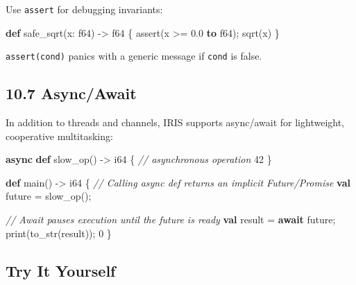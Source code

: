 \documentclass[
  english,
]{book}
\newenvironment{Shaded}{\begin{snugshade}}{\end{snugshade}}
\newcommand{\CommentTok}[1]{\textcolor[rgb]{0.42,0.60,0.33}{\textit{#1}}}
\newcommand{\DataTypeTok}[1]{\textcolor[rgb]{0.31,0.79,0.69}{#1}}
\newcommand{\DecValTok}[1]{\textcolor[rgb]{0.71,0.81,0.66}{#1}}
\newcommand{\FloatTok}[1]{\textcolor[rgb]{0.71,0.81,0.66}{#1}}
\newcommand{\FunctionTok}[1]{\textcolor[rgb]{0.86,0.86,0.67}{#1}}
\newcommand{\KeywordTok}[1]{\textcolor[rgb]{0.34,0.61,0.84}{\textbf{#1}}}
\newcommand{\NormalTok}[1]{\textcolor[rgb]{0.83,0.83,0.83}{#1}}
\newcommand{\OperatorTok}[1]{\textcolor[rgb]{0.83,0.83,0.83}{#1}}
\begin{document}
Use \texttt{assert} for debugging invariants:

\begin{Shaded}
\begin{Highlighting}[]
\KeywordTok{def}\NormalTok{ safe\_sqrt(x: }\DataTypeTok{f64}\NormalTok{) }\OperatorTok{{-}\textgreater{}} \DataTypeTok{f64}\NormalTok{ \{}
    \FunctionTok{assert}\NormalTok{(x }\OperatorTok{\textgreater{}=} \FloatTok{0.0} \KeywordTok{to} \DataTypeTok{f64}\NormalTok{);}
    \FunctionTok{sqrt}\NormalTok{(x)}
\NormalTok{\}}
\end{Highlighting}
\end{Shaded}

\texttt{assert(cond)} panics with a generic message if \texttt{cond} is
false.

\subsection{10.7 Async/Await}\label{asyncawait}

In addition to threads and channels, IRIS supports async/await for
lightweight, cooperative multitasking:

\begin{Shaded}
\begin{Highlighting}[]
\KeywordTok{async} \KeywordTok{def}\NormalTok{ slow\_op() }\OperatorTok{{-}\textgreater{}} \DataTypeTok{i64}\NormalTok{ \{}
    \CommentTok{// asynchronous operation}
    \DecValTok{42}
\NormalTok{\}}

\KeywordTok{def}\NormalTok{ main() }\OperatorTok{{-}\textgreater{}} \DataTypeTok{i64}\NormalTok{ \{}
    \CommentTok{// Calling async def returns an implicit Future/Promise}
    \KeywordTok{val}\NormalTok{ future }\OperatorTok{=}\NormalTok{ slow\_op();}
    
    \CommentTok{// Await pauses execution until the future is ready}
    \KeywordTok{val} \DataTypeTok{result} \OperatorTok{=} \KeywordTok{await}\NormalTok{ future;}
    \FunctionTok{print}\NormalTok{(}\FunctionTok{to\_str}\NormalTok{(}\DataTypeTok{result}\NormalTok{));}
    \DecValTok{0}
\NormalTok{\}}
\end{Highlighting}
\end{Shaded}

\subsection{Try It Yourself}\label{try-it-yourself-9}
\end{document}
